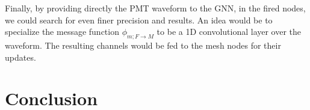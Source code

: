 \documentclass[../main.tex]{subfiles}
\begin{document}
Finally, by providing directly the PMT waveform to the GNN, in the fired nodes, we could search for even finer precision and results. An idea would be to specialize the message function $\phi_{m;F \rightarrow M}$ to be a 1D convolutional layer over the waveform. The resulting channels would be fed to the mesh nodes for their updates.

\section{Conclusion}


%
%
\end{document}

